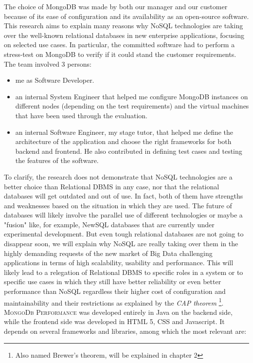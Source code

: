 The choice of MongoDB was made by both our manager and our customer because of its ease of configuration and its availability as 
an open-source software.
This research aims to explain many reasons why NoSQL technologies are taking over the well-known relational databases in new enterprise applications, focusing on selected use cases.
In particular, the committed software had to perform a stress-test on MongoDB to verify if it could stand the customer requirements.
The team involved 3 persons:
\begin{itemize}
  \item me as Software Developer.
  \item an internal System Engineer that helped me configure MongoDB instances on different nodes (depending on the test requirements) and the virtual machines that have been used through the evaluation.
  \item an internal Software Engineer, my stage tutor, that helped me define the architecture of the application and choose the right frameworks for both backend and frontend. He also contributed in defining test cases and testing the features of the software.
\end{itemize}
To clarify, the research does not demonstrate that NoSQL technologies are a better choice than Relational DBMS in any case, nor that the relational databases will get outdated and out of use.
In fact, both of them have strengths and weaknesses based on the situation in which they are used.
The future of databases will likely involve the parallel use of different technologies or maybe a "fusion" like, for example, NewSQL databases that are currently under experimental development.
But even tough relational databases are not going to disappear soon, we will explain why NoSQL are really taking over them in the highly demanding requests of the new market of Big Data challenging applications in terms of high scalability, usability and performance.
This will likely lead to a relegation of Relational DBMS to specific roles in a system or to specific use cases in which they still have better reliability or even better performance than NoSQL regardless their higher cost of configuration and maintainability and their restrictions as explained by the \textit{CAP theorem} \footnote{Also named Brewer's theorem, will be explained in chapter 2}.
\textsc{MongoDb Performance} was developed entirely in Java on the backend side, while the frontend side was developed in HTML 5, CSS and Javascript.
It depends on several frameworks and libraries, among which the most relevant are:

